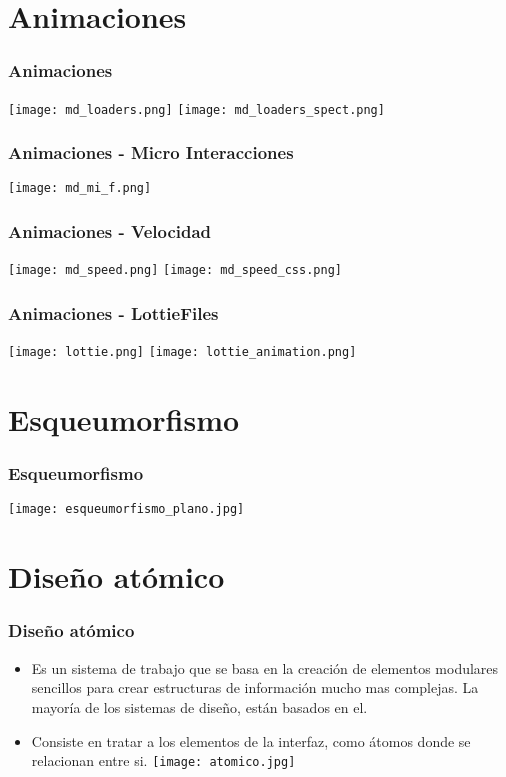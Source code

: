 \documentclass[11pt]{beamer}
\begin{document}
\section{Animaciones}
\begin{frame}
\frametitle{Animaciones}
{\texttt{[image: md\_loaders.png]}}
{\texttt{[image: md\_loaders\_spect.png]}}
\centering
\end{frame}

\begin{frame}
\frametitle{Animaciones - Micro Interacciones}
{\texttt{[image: md\_mi\_f.png]}}
\centering
\end{frame}

\begin{frame}
\frametitle{Animaciones - Velocidad}
{\texttt{[image: md\_speed.png]}}
{\texttt{[image: md\_speed\_css.png]}}
\centering
\end{frame}

\begin{frame}
\frametitle{Animaciones - LottieFiles}
{\texttt{[image: lottie.png]}}
{\texttt{[image: lottie\_animation.png]}}
\centering
\end{frame}

\section{Esqueumorfismo}
\begin{frame}
\frametitle{Esqueumorfismo}
{\texttt{[image: esqueumorfismo\_plano.jpg]}}
\centering
\end{frame}

\section{Diseño atómico}
\begin{frame}
\frametitle{Diseño atómico}
\begin{itemize}
    \item{Es un sistema de trabajo que se basa en la creación de elementos modulares sencillos para crear estructuras de información mucho mas complejas. La mayoría de los sistemas de diseño, están basados en el.}
    \item{Consiste en tratar a los elementos de la interfaz, como átomos donde se relacionan entre si.}
    {\texttt{[image: atomico.jpg]}}
\end{itemize}
\end{frame}
\end{document}
